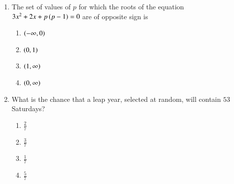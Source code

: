 \documentclass[journal,12pt,onecolumn]{IEEEtran}
\theoremstyle{remark}
\begin{document}
\begin{enumerate}
\item The set of values of $p$ for which the roots of the equation $3x^2 + 2x + p\left(p - 1\right) = 0$ are of opposite sign is
\begin{multicols}{4}
\begin{enumerate}
\item $\left(-\infty, 0\right)$
\item $\left(0, 1\right)$
\item $\left(1, \infty\right)$
\item $\left(0,\infty\right)$
\end{enumerate}
\end{multicols}
\hfill {}

\item What is the chance that a leap year, selected at random, will contain $53$ Saturdays?
\begin{multicols}{4}
\begin{enumerate}
\item $\frac{2}{7}$
\item $\frac{3}{7}$
\item $\frac{1}{7}$
\item $\frac{5}{7}$
\end{enumerate}
\end{multicols}
\hfill {}















\end{enumerate}
\end{document}

